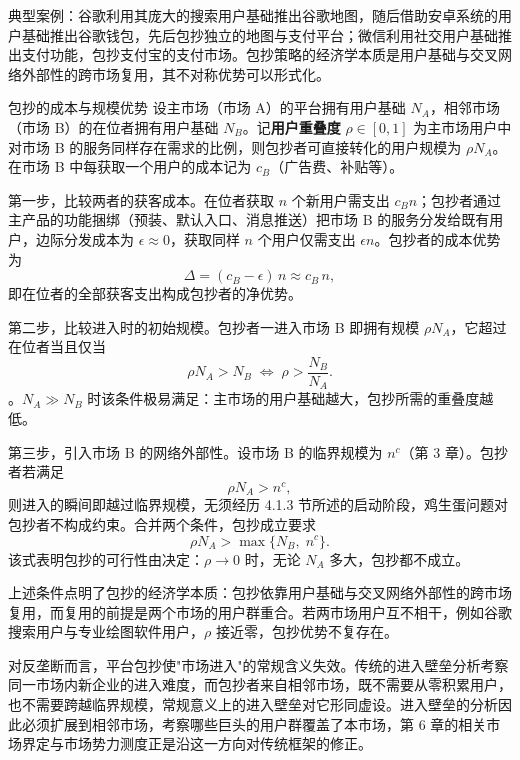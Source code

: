 典型案例：谷歌利用其庞大的搜索用户基础推出谷歌地图，随后借助安卓系统的用户基础推出谷歌钱包，先后包抄独立的地图与支付平台；微信利用社交用户基础推出支付功能，包抄支付宝的支付市场。包抄策略的经济学本质是用户基础与交叉网络外部性的跨市场复用，其不对称优势可以形式化。

\begin{derivation}{包抄的成本与规模优势}{}
设主市场（市场 A）的平台拥有用户基础 $N_A$，相邻市场（市场 B）的在位者拥有用户基础 $N_B$。记\textbf{用户重叠度} $\rho \in [0,1]$ 为主市场用户中对市场 B 的服务同样存在需求的比例，则包抄者可直接转化的用户规模为 $\rho N_A$。在市场 B 中每获取一个用户的成本记为 $c_B$（广告费、补贴等）。

第一步，比较两者的获客成本。在位者获取 $n$ 个新用户需支出 $c_Bn$；包抄者通过主产品的功能捆绑（预装、默认入口、消息推送）把市场 B 的服务分发给既有用户，边际分发成本为 $\epsilon \approx 0$，获取同样 $n$ 个用户仅需支出 $\epsilon n$。包抄者的成本优势为
\[
\Delta = (c_B-\epsilon)\,n \approx c_B\,n,
\]
即在位者的全部获客支出构成包抄者的净优势。

第二步，比较进入时的初始规模。包抄者一进入市场 B 即拥有规模 $\rho N_A$，它超过在位者当且仅当
\[
\rho N_A > N_B
\;\Longleftrightarrow\;
\rho > \frac{N_B}{N_A}.
\]
。$N_A \gg N_B$ 时该条件极易满足：主市场的用户基础越大，包抄所需的重叠度越低。

第三步，引入市场 B 的网络外部性。设市场 B 的临界规模为 $n^c$（第 3 章）。包抄者若满足
\[
\rho N_A > n^c,
\]
则进入的瞬间即越过临界规模，无须经历 4.1.3 节所述的启动阶段，鸡生蛋问题对包抄者不构成约束。合并两个条件，包抄成立要求
\[
\rho N_A > \max\{N_B,\; n^c\}.
\]
该式表明包抄的可行性由决定：$\rho \to 0$ 时，无论 $N_A$ 多大，包抄都不成立。
\end{derivation}

上述条件点明了包抄的经济学本质：包抄依靠用户基础与交叉网络外部性的跨市场复用，而复用的前提是两个市场的用户群重合。若两市场用户互不相干，例如谷歌搜索用户与专业绘图软件用户，$\rho$ 接近零，包抄优势不复存在。

对反垄断而言，平台包抄使"市场进入"的常规含义失效。传统的进入壁垒分析考察同一市场内新企业的进入难度，而包抄者来自相邻市场，既不需要从零积累用户，也不需要跨越临界规模，常规意义上的进入壁垒对它形同虚设。进入壁垒的分析因此必须扩展到相邻市场，考察哪些巨头的用户群覆盖了本市场，第 6 章的相关市场界定与市场势力测度正是沿这一方向对传统框架的修正。

